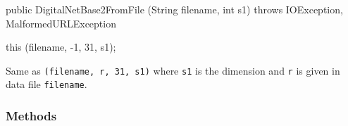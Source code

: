 \begin{htmlonly}
\end{htmlonly}
\begin{code} 

   public DigitalNetBase2FromFile (String filename, int s1) 
        throws IOException, MalformedURLException\begin{hide}
   {
       this (filename, -1, 31, s1);
   }\end{hide}
\end{code} 
\begin{tabb}
   Same as \texttt{(filename, r, 31, s1)} where
   \texttt{s1} is the dimension and \texttt{r} is given in data file \texttt{filename}.
\end{tabb}
\begin{htmlonly}
\end{htmlonly}


\subsubsection*{Methods}

